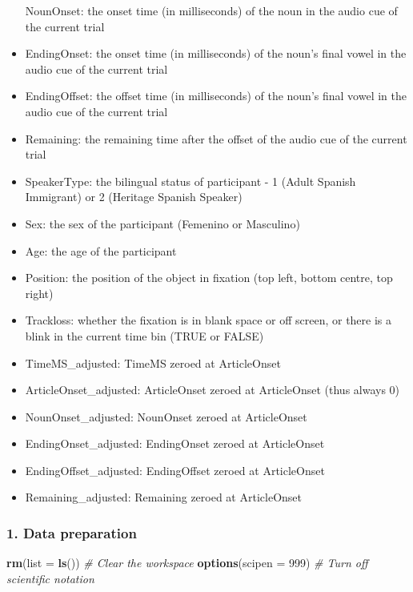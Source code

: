 \documentclass[
]{article}
\newenvironment{Shaded}{\begin{snugshade}}{\end{snugshade}}
\newcommand{\AttributeTok}[1]{\textcolor[rgb]{0.13,0.29,0.53}{#1}}
\newcommand{\CommentTok}[1]{\textcolor[rgb]{0.56,0.35,0.01}{\textit{#1}}}
\newcommand{\DecValTok}[1]{\textcolor[rgb]{0.00,0.00,0.81}{#1}}
\newcommand{\FunctionTok}[1]{\textcolor[rgb]{0.13,0.29,0.53}{\textbf{#1}}}
\newcommand{\NormalTok}[1]{#1}
\begin{document}
\begin{itemize}
  NounOnset: the onset time (in milliseconds) of the noun in the audio
  cue of the current trial
\item
  EndingOnset: the onset time (in milliseconds) of the noun's final
  vowel in the audio cue of the current trial
\item
  EndingOffset: the offset time (in milliseconds) of the noun's final
  vowel in the audio cue of the current trial
\item
  Remaining: the remaining time after the offset of the audio cue of the
  current trial
\item
  SpeakerType: the bilingual status of participant - 1 (Adult Spanish
  Immigrant) or 2 (Heritage Spanish Speaker)
\item
  Sex: the sex of the participant (Femenino or Masculino)
\item
  Age: the age of the participant
\item
  Position: the position of the object in fixation (top left, bottom
  centre, top right)
\item
  Trackloss: whether the fixation is in blank space or off screen, or
  there is a blink in the current time bin (TRUE or FALSE)
\item
  TimeMS\_adjusted: TimeMS zeroed at ArticleOnset
\item
  ArticleOnset\_adjusted: ArticleOnset zeroed at ArticleOnset (thus
  always 0)
\item
  NounOnset\_adjusted: NounOnset zeroed at ArticleOnset
\item
  EndingOnset\_adjusted: EndingOnset zeroed at ArticleOnset
\item
  EndingOffset\_adjusted: EndingOffset zeroed at ArticleOnset
\item
  Remaining\_adjusted: Remaining zeroed at ArticleOnset
\end{itemize}

\subsubsection{1. Data preparation}\label{data-preparation}

\begin{Shaded}
\begin{Highlighting}[]
\FunctionTok{rm}\NormalTok{(}\AttributeTok{list =} \FunctionTok{ls}\NormalTok{()) }\CommentTok{\# Clear the workspace}
\FunctionTok{options}\NormalTok{(}\AttributeTok{scipen =} \DecValTok{999}\NormalTok{) }\CommentTok{\# Turn off scientific notation}
\end{Highlighting}
\end{Shaded}
\end{document}
